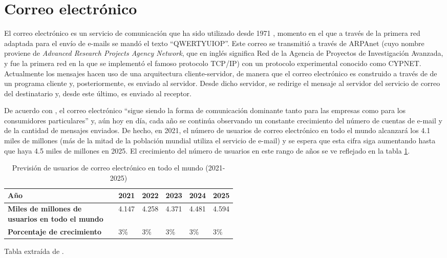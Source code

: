 \section{Correo electrónico}\label{s:email}
El correo electrónico \citep[Capítulo 11]{redhatemail} es un servicio de comunicación que ha sido utilizado desde 1971 \citep{wikiemail}, momento en el que a través de la primera red adaptada para el envío de e-mails se mandó el texto ``QWERTYUIOP''. Este correo se transmitió a través de ARPAnet (cuyo nombre proviene de \textit{Advanced Research Projects Agency Network}, que en inglés significa Red de la Agencia de Proyectos de Investigación Avanzada, y fue la primera red en la que se implementó el famoso protocolo TCP/IP) con un protocolo experimental conocido como CYPNET. Actualmente los mensajes hacen uso de una arquitectura cliente-servidor, de manera que el correo electrónico es construido a través de de un programa cliente y, posteriormente, es enviado al servidor. Desde dicho servidor, se redirige el mensaje al servidor del servicio de correo del destinatario y, desde este último, es enviado al receptor.

De acuerdo con \cite{radicati2020email}, el correo electrónico ``sigue siendo la forma de comunicación dominante tanto para las empresas como para los consumidores particulares'' y, aún hoy en día, cada año se continúa observando un constante crecimiento del número de cuentas de e-mail y de la cantidad de mensajes enviados. De hecho, en 2021, el número de usuarios de correo electrónico en todo el mundo alcanzará los 4.1 miles de millones (más de la mitad de la población mundial utiliza el servicio de e-mail) y se espera que esta cifra siga aumentando hasta que haya 4.5 miles de millones en 2025. El crecimiento del número de usuarios en este rango de años se ve reflejado en la tabla \ref{tab:emailusers}.

\begin{table}[h]
	\centering
	\begin{tabular}{|p{0.52\linewidth}|l|l|l|l|l|}
		\hline
		\textbf{Año} & 2021 & 2022 & 2023 & 2024 & 2025 \\ \hline
		\textbf{Miles de millones de usuarios en todo el mundo} & 4.147 & 4.258 & 4.371 & 4.481 & 4.594\\ \hline
		\textbf{Porcentaje de crecimiento} & 3\% & 3\% & 3\% & 3\% & 3\% \\ \hline
	\end{tabular}
	\caption{Previsión de usuarios de correo electrónico en todo el mundo (2021-2025)}\label{tab:emailusers}
	Tabla extraída de \cite{radicati2020email}.
\end{table}

